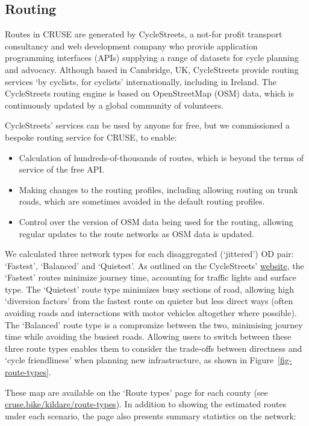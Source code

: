 \documentclass[
  super,
  preprint,
  3p]{elsarticle}
\providecommand{\tightlist}{%
  \setlength{\itemsep}{0pt}\setlength{\parskip}{0pt}}\usepackage{longtable,booktabs,array}
\begin{document}
\hypertarget{routing}{%
\subsection{Routing}\label{routing}}

Routes in CRUSE are generated by CycleStreets, a not-for profit
transport consultancy and web development company who provide
application programming interfaces (APIs) supplying a range of datasets
for cycle planning and advocacy. Although based in Cambridge, UK,
CycleStreets provide routing services `by cyclists, for cyclists'
internationally, including in Ireland. The CycleStreets routing engine
is based on OpenStreetMap (OSM) data, which is continuously updated by a
global community of volunteers.

CycleStreets' services can be used by anyone for free, but we
commissioned a bespoke routing service for CRUSE, to enable:

\begin{itemize}
\tightlist
\item
  Calculation of hundreds-of-thousands of routes, which is beyond the
  terms of service of the free API.
\item
  Making changes to the routing profiles, including allowing routing on
  trunk roads, which are sometimes avoided in the default routing
  profiles.
\item
  Control over the version of OSM data being used for the routing,
  allowing regular updates to the route networks as OSM data is updated.
\end{itemize}

We calculated three network types for each disaggregated (`jittered') OD
pair: `Fastest', `Balanced' and `Quietest'. As outlined on the
CycleStreets'
\href{https://www.cyclestreets.net/help/journey/howitworks/}{website},
the `Fastest' routes minimize journey time, accounting for traffic
lights and surface type. The `Quietest' route type minimizes busy
sections of road, allowing high `diversion factors' from the fastest
route on quieter but less direct ways (often avoiding roads and
interactions with motor vehicles altogether where possible). The
`Balanced' route type is a compromize between the two, minimising
journey time while avoiding the busiest roads. Allowing users to switch
between these three route types enables them to consider the trade-offs
between directness and `cycle friendliness' when planning new
infrastructure, as shown in Figure~\ref{fig-route-types}.

These map are available on the `Route types' page for each county (see
\href{https://cruse.bike/kildare/route-types}{cruse.bike/kildare/route-types}).
In addition to showing the estimated routes under each scenario, the
page also presents summary statistics on the network:
\end{document}
